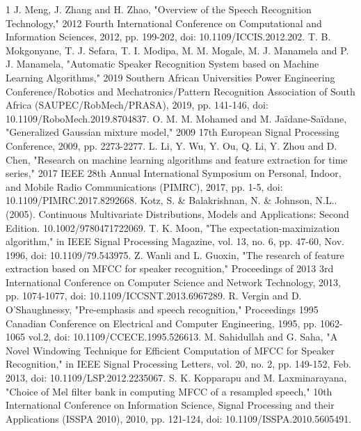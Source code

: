 \documentclass{article}
\begin{document}
\begin{thebibliography}{1}
J. Meng, J. Zhang and H. Zhao, "Overview of the Speech Recognition Technology," 2012 Fourth International Conference on Computational and Information Sciences, 2012, pp. 199-202, doi: 10.1109/ICCIS.2012.202.
 T. B. Mokgonyane, T. J. Sefara, T. I. Modipa, M. M. Mogale, M. J. Manamela and P. J. Manamela, "Automatic Speaker Recognition System based on Machine Learning Algorithms," 2019 Southern African Universities Power Engineering Conference/Robotics and Mechatronics/Pattern Recognition Association of South Africa (SAUPEC/RobMech/PRASA), 2019, pp. 141-146, doi: 10.1109/RoboMech.2019.8704837.
O. M. M. Mohamed and M. Jaïdane-Saïdane, "Generalized Gaussian mixture model," 2009 17th European Signal Processing Conference, 2009, pp. 2273-2277.
L. Li, Y. Wu, Y. Ou, Q. Li, Y. Zhou and D. Chen, "Research on machine learning algorithms and feature extraction for time series," 2017 IEEE 28th Annual International Symposium on Personal, Indoor, and Mobile Radio Communications (PIMRC), 2017, pp. 1-5, doi: 10.1109/PIMRC.2017.8292668. 
Kotz, S. \& Balakrishnan, N. \& Johnson, N.L.. (2005). Continuous Multivariate Distributions, Models and Applications: Second Edition. 10.1002/9780471722069. 
T. K. Moon, "The expectation-maximization algorithm," in IEEE Signal Processing Magazine, vol. 13, no. 6, pp. 47-60, Nov. 1996, doi: 10.1109/79.543975.
Z. Wanli and L. Guoxin, "The research of feature extraction based on MFCC for speaker recognition," Proceedings of 2013 3rd International Conference on Computer Science and Network Technology, 2013, pp. 1074-1077, doi: 10.1109/ICCSNT.2013.6967289.
R. Vergin and D. O'Shaughnessy, "Pre-emphasis and speech recognition," Proceedings 1995 Canadian Conference on Electrical and Computer Engineering, 1995, pp. 1062-1065 vol.2, doi: 10.1109/CCECE.1995.526613.
M. Sahidullah and G. Saha, "A Novel Windowing Technique for Efficient Computation of MFCC for Speaker Recognition," in IEEE Signal Processing Letters, vol. 20, no. 2, pp. 149-152, Feb. 2013, doi: 10.1109/LSP.2012.2235067.
S. K. Kopparapu and M. Laxminarayana, "Choice of Mel filter bank in computing MFCC of a resampled speech," 10th International Conference on Information Science, Signal Processing and their Applications (ISSPA 2010), 2010, pp. 121-124, doi: 10.1109/ISSPA.2010.5605491.
\end{thebibliography}
\end{document}
